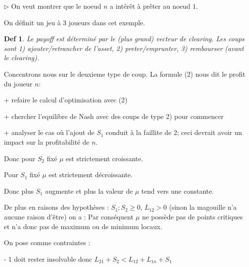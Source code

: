 \documentclass[11pt,oneside,twocolumn]{article}
\newtheorem{definition}{Def}
\begin{document}
$\triangleright$ 
On veut montrer que le noeud $n$ a intérêt à prêter au noeud $1$.

On définit un jeu à 3 joueurs dans cet exemple.
\begin{definition}\label{jeu3}
Le payoff est déterminé par le (plus grand) vecteur de clearing.
Les coups sont 1) ajouter/retrancher de l'asset,
2) preter/emprunter,
3) rembourser (avant le clearing).
\end{definition}

Concentrons nous sur le deuxieme type de coup.
La formule (2) nous dit le profit du joueur $n$:

+ refaire le calcul d'optimisation avec (2)

+ chercher l'equilibre de Nash avec des coups de type 2) pour commencer

+ analyser le cas où l'ajout de $S_1$ conduit à la faillite de 2; ceci devrait avoir un impact sur la profitabilité de $n$.

Donc pour $S_{2}$ fixé $\mu$ est strictement croissante.


Pour $S_{1}$ fixé $\mu$ est strictement décroissante.


Donc plus $S_{1}$ augmente et plus la valeur de $\mu$ tend vers une constante.


De plus en raisons des hypothèses : $S_{1}; S_{2} \geq 0$, $L_{12} > 0$ (sinon la magouille n'a aucune raison d'être) on a :
Par conséquent $\mu$ ne possède pas de points critiques et n'a donc pas de maximum ou de minimum locaux. 


On pose comme contraintes :

- 1 doit rester insolvable donc $L_{21} + S_{2} < L_{12} + L_{1n} + S_{1}$
\end{document}
